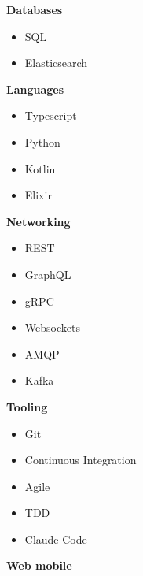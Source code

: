 \documentclass[11pt]{article}
\newcommand{\skillcategory}[1]{%
      {\bfseries #1}
      \vspace{-6pt}
  }
\begin{document}
\begin{paracol}{2}
\begin{leftcolumn}
\skillcategory{Databases}
\begin{itemize}

    \item SQL

    \item Elasticsearch

\end{itemize}

\skillcategory{Languages}
\begin{itemize}

    \item Typescript

    \item Python

    \item Kotlin

    \item Elixir

\end{itemize}

\skillcategory{Networking}
\begin{itemize}

    \item REST

    \item GraphQL

    \item gRPC

    \item Websockets

    \item AMQP

    \item Kafka

\end{itemize}

\skillcategory{Tooling}
\begin{itemize}

    \item Git

    \item Continuous Integration

    \item Agile

    \item TDD

    \item Claude Code

\end{itemize}

\skillcategory{Web mobile}
\begin{itemize}


\end{itemize}
\end{leftcolumn}
\end{paracol}
\end{document}
